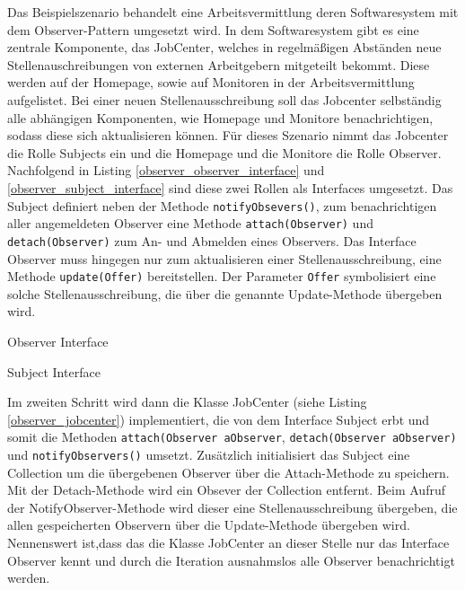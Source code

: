 Das Beispielszenario behandelt eine Arbeitsvermittlung deren Softwaresystem mit dem  Observer-Pattern umgesetzt wird. In dem Softwaresystem gibt es eine zentrale Komponente, das JobCenter, welches in regelmäßigen Abständen neue Stellenauschreibungen von externen Arbeitgebern mitgeteilt bekommt. Diese werden auf der Homepage, sowie auf Monitoren in der Arbeitsvermittlung aufgelistet. Bei einer neuen Stellenausschreibung soll das Jobcenter selbständig alle abhängigen Komponenten, wie Homepage und Monitore benachrichtigen, sodass diese sich aktualisieren können.
Für dieses Szenario nimmt das Jobcenter  die Rolle Subjects ein und die Homepage und die Monitore die Rolle Observer. Nachfolgend in Listing \ref{observer_observer_interface} und \ref{observer_subject_interface} sind diese zwei Rollen als Interfaces umgesetzt.
Das Subject definiert neben der Methode \texttt{notifyObsevers()}, zum benachrichtigen aller angemeldeten Observer eine Methode \texttt{attach(Observer)} und \texttt{detach(Observer)} zum An- und Abmelden eines Observers. Das Interface Observer muss hingegen nur zum aktualisieren einer Stellenausschreibung, eine Methode \texttt{update(Offer)} bereitstellen. Der Parameter \texttt{Offer} symbolisiert eine solche Stellenausschreibung, die über die genannte Update-Methode übergeben wird.


\begin{listing}[h!]
   \centering
   \caption{Observer Interface}
    \label{observer_observer_interface}
\end{listing}     
 
\begin{listing}[h!]
   \centering
   \caption{Subject Interface}
    \label{observer_subject_interface}
\end{listing}  
          
  
Im zweiten Schritt wird dann die Klasse JobCenter (siehe Listing \ref{observer_jobcenter}) implementiert, die von dem Interface Subject erbt und somit die Methoden \texttt{attach(Observer aObserver}, \texttt{detach(Observer aObserver)} und \texttt{notifyObservers()} umsetzt. Zusätzlich initialisiert das Subject eine Collection um die übergebenen Observer über die Attach-Methode zu speichern. Mit der Detach-Methode wird ein Obsever der Collection entfernt. Beim Aufruf der NotifyObserver-Methode wird dieser eine Stellenausschreibung übergeben, die allen gespeicherten Observern über die Update-Methode übergeben wird. 
Nennenswert ist,dass das die Klasse JobCenter an dieser Stelle nur das Interface Observer kennt und durch die Iteration ausnahmslos alle Observer benachrichtigt werden.

